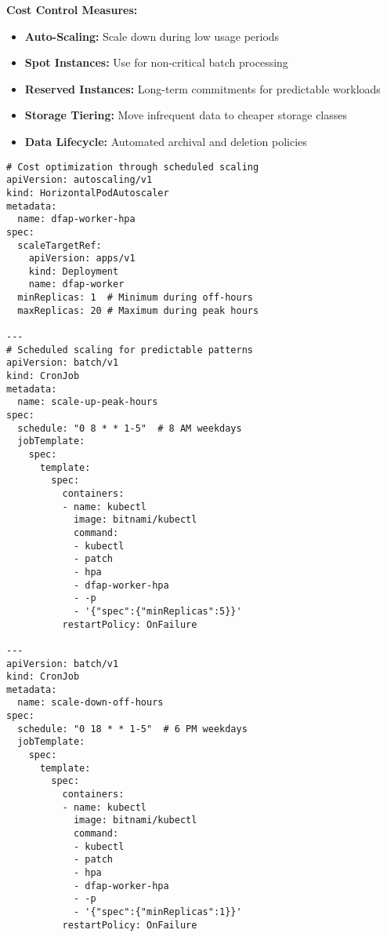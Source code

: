 \textbf{Cost Control Measures:}
\begin{itemize}
  \item \textbf{Auto-Scaling:} Scale down during low usage periods
  \item \textbf{Spot Instances:} Use for non-critical batch processing
  \item \textbf{Reserved Instances:} Long-term commitments for predictable workloads
  \item \textbf{Storage Tiering:} Move infrequent data to cheaper storage classes
  \item \textbf{Data Lifecycle:} Automated archival and deletion policies
\end{itemize}

\begin{verbatim}
# Cost optimization through scheduled scaling
apiVersion: autoscaling/v1
kind: HorizontalPodAutoscaler
metadata:
  name: dfap-worker-hpa
spec:
  scaleTargetRef:
    apiVersion: apps/v1
    kind: Deployment
    name: dfap-worker
  minReplicas: 1  # Minimum during off-hours
  maxReplicas: 20 # Maximum during peak hours

---
# Scheduled scaling for predictable patterns
apiVersion: batch/v1
kind: CronJob
metadata:
  name: scale-up-peak-hours
spec:
  schedule: "0 8 * * 1-5"  # 8 AM weekdays
  jobTemplate:
    spec:
      template:
        spec:
          containers:
          - name: kubectl
            image: bitnami/kubectl
            command:
            - kubectl
            - patch
            - hpa
            - dfap-worker-hpa
            - -p
            - '{"spec":{"minReplicas":5}}'
          restartPolicy: OnFailure

---
apiVersion: batch/v1
kind: CronJob
metadata:
  name: scale-down-off-hours
spec:
  schedule: "0 18 * * 1-5"  # 6 PM weekdays
  jobTemplate:
    spec:
      template:
        spec:
          containers:
          - name: kubectl
            image: bitnami/kubectl
            command:
            - kubectl
            - patch
            - hpa
            - dfap-worker-hpa
            - -p
            - '{"spec":{"minReplicas":1}}'
          restartPolicy: OnFailure
\end{verbatim} 